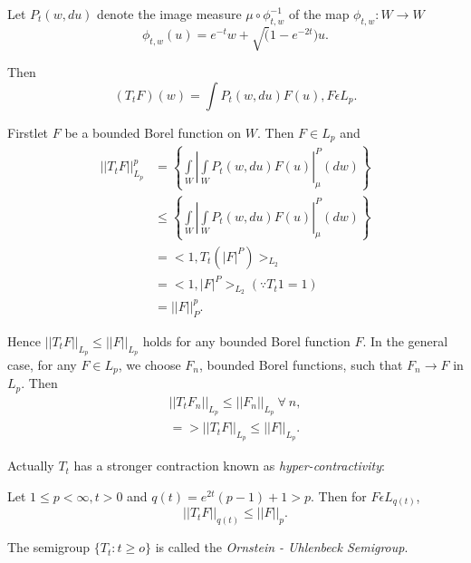 \medskip
{}
  Let $P_t (w, du)$ denote the image measure $\mu \circ \phi^{-1}_{t, w}$
  of the map $\phi_{t,w}: W \to W$ 
  $$
  \phi_{t, w}(u) = e^{-t} w + \surd (1-e^{-2t})u.
  $$

Then 
$$
(T_t F)(w) = \int P_t (w, du) F(u), F \epsilon  L_p.
$$

First\pageoriginale let $F$ be a bounded Borel function on $W$. Then $F
\in L_p$ and  
\begin{align*}
 || T_t F ||^p _{L_p} & = \left\{\int\limits_W | \int\limits_W P_t (w, du)
 F(u)|^P_\mu (dw)\right\}\\ 
 & \leq   \left\{\int\limits_W | \int\limits_W P_t (w, du)
 F(u)|^P_\mu (dw)\right\} \\ 
 & = < 1, T_t (|F|^P) >_{L_2}\\
 & = < 1, |F|^P >_{L_2} (\because T_t 1 = 1)\\
 & = || F ||^p_P.
\end{align*}

Hence $|| T_t F||_{L_p} \leq || F ||_{L_p}$ holds for any bounded
Borel function $F$. In the general case, for any $F \in L_p$, we
choose $F_n$, bounded Borel functions, such that $F_n \to F$ in
$L_p$. Then  
\begin{gather*}
  || T_t F_n ||_{L_p} \leq || F_n||_{L_p} ~\forall~ n, \\
  => || T_t F||_{L_p} \leq || F ||_{L_p}. 
\end{gather*}

Actually $T_t$ has a stronger contraction known as
\textit{hyper-contractivity}:  

\setcounter{theorem}{2}
\begin{theorem}[Nelson]\label{chap1:thm1.3} %
 Let $1 \leq p <\infty, t > 0$ and $q(t) = e^{2t}(p-1)
  + 1 > p$. Then for $F \epsilon  L_{q(t)}$,  
  $$
  || T_t F|| _{q(t)} \leq || F||_p.
  $$
\end{theorem}

\begin{remark*} %
  The semigroup $\{ T_t: t \geq o \}$ is called the {\em Ornstein -
  Uhlenbeck Semigroup}.  
\end{remark*}


